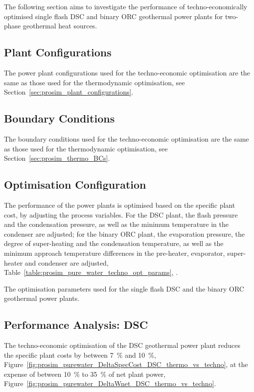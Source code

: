 The following section aims to investigate the performance of techno-economically optimised single flash \ac{DSC} and binary \ac{ORC} geothermal power plants for two-phase geothermal heat sources.

\subsection{Plant Configurations}
    The power plant configurations used for the techno-economic optimisation are the same as those used for the thermodynamic optimisation, see Section~\ref{sec:prosim_plant_configurations}.

\subsection{Boundary Conditions}
    The boundary conditions used for the techno-economic optimisation are the same as those used for the thermodynamic optimisation, see Section~\ref{sec:prosim_thermo_BCs}.

\subsection{Optimisation Configuration}
    The performance of the power plants is optimised based on the specific plant cost, by adjusting the process variables. For the \ac{DSC} plant, the flash pressure and the condensation pressure, as well as the minimum temperature in the condenser are adjusted; for the binary \ac{ORC} plant, the evaporation pressure, the degree of super-heating and the condensation temperature, as well as the minimum approach temperature differences in the pre-heater, evaporator, super-heater and condenser are adjusted,  Table~\ref{table:prosim_pure_water_techno_opt_params}, .

    \begin{table}[H]
        \centering
        \caption{The optimisation parameters used for the single flash \ac{DSC} and the binary \ac{ORC} geothermal power plants.}
        \label{table:prosim_pure_water_techno_opt_params}
                
    \end{table}

\subsection{Performance Analysis: DSC}

    The techno-economic optimisation of the \ac{DSC} geothermal power plant reduces the specific plant costs by between \qty{7}{\percent} and \qty{10}{\percent},  Figure~\ref{fig:prosim_purewater_DeltaSpecCost_DSC_thermo_vs_techno}, at the expense of between \qty{10}{\percent} to \qty{35}{\percent} of net plant power, Figure~\ref{fig:prosim_purewater_DeltaWnet_DSC_thermo_vs_techno}.

